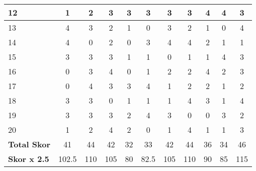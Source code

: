 \begin{table}[hbt!]
\begin{threeparttable}
\begin{tabular}{l*{10}{c}}
            \hline
            12 & 1 & 2 & 3 & 3 & 3 & 3 & 3 & 4 & 4 & 3 \\
            \hline
            13 & 4 & 3 & 2 & 1 & 0 & 3 & 2 & 1 & 0 & 4 \\
            \hline
            14 & 4 & 0 & 2 & 0 & 3 & 4 & 4 & 2 & 1 & 1 \\
            \hline
            15 & 3 & 3 & 3 & 1 & 1 & 0 & 1 & 1 & 4 & 3 \\
            \hline
            16 & 0 & 3 & 4 & 0 & 1 & 2 & 2 & 4 & 2 & 3 \\
            \hline
            17 & 0 & 4 & 3 & 3 & 4 & 1 & 2 & 2 & 1 & 2 \\
            \hline
            18 & 3 & 3 & 0 & 1 & 1 & 1 & 4 & 3 & 1 & 4 \\
            \hline
            19 & 3 & 3 & 3 & 2 & 4 & 3 & 0 & 0 & 3 & 2 \\
            \hline
            20 & 1 & 2 & 4 & 2 & 0 & 1 & 4 & 1 & 1 & 3 \\
            \midrule
            \textbf{Total Skor}   & 41 & 44 & 42 & 32 & 33 & 42 & 44 & 36 & 34 & 46 \\
            \hline
            \textbf{Skor x 2.5}   & 102.5 & 110 & 105 & 80 & 82.5 & 105 & 110 & 90 & 85 & 115 \\
            \bottomrule
        \end{tabular}
    \end{threeparttable}
\end{table}


